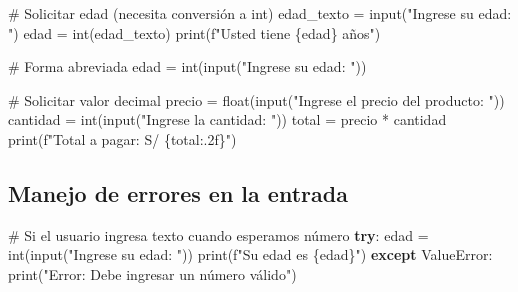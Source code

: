 \documentclass[
  doc,
  floatsintext,
  longtable,
  a4paper,
  nolmodern,
  notxfonts,
  notimes,
  12pt,
  colorlinks=true,linkcolor=blue,citecolor=blue,urlcolor=blue]{apa7}
\newenvironment{Shaded}{\begin{snugshade}}{\end{snugshade}}
\newcommand{\BuiltInTok}[1]{\textcolor[rgb]{0.00,0.23,0.31}{#1}}
\newcommand{\CommentTok}[1]{\textcolor[rgb]{0.37,0.37,0.37}{#1}}
\newcommand{\ControlFlowTok}[1]{\textcolor[rgb]{0.00,0.23,0.31}{\textbf{#1}}}
\newcommand{\NormalTok}[1]{\textcolor[rgb]{0.00,0.23,0.31}{#1}}
\newcommand{\OperatorTok}[1]{\textcolor[rgb]{0.37,0.37,0.37}{#1}}
\newcommand{\PreprocessorTok}[1]{\textcolor[rgb]{0.68,0.00,0.00}{#1}}
\newcommand{\SpecialCharTok}[1]{\textcolor[rgb]{0.37,0.37,0.37}{#1}}
\newcommand{\SpecialStringTok}[1]{\textcolor[rgb]{0.13,0.47,0.30}{#1}}
\newcommand{\StringTok}[1]{\textcolor[rgb]{0.13,0.47,0.30}{#1}}
\begin{document}
\begin{Shaded}
\begin{Highlighting}[]
\CommentTok{\# Solicitar edad (necesita conversión a int)}
\NormalTok{edad\_texto }\OperatorTok{=} \BuiltInTok{input}\NormalTok{(}\StringTok{"Ingrese su edad: "}\NormalTok{)}
\NormalTok{edad }\OperatorTok{=} \BuiltInTok{int}\NormalTok{(edad\_texto)}
\BuiltInTok{print}\NormalTok{(}\SpecialStringTok{f"Usted tiene }\SpecialCharTok{\{}\NormalTok{edad}\SpecialCharTok{\}}\SpecialStringTok{ años"}\NormalTok{)}

\CommentTok{\# Forma abreviada}
\NormalTok{edad }\OperatorTok{=} \BuiltInTok{int}\NormalTok{(}\BuiltInTok{input}\NormalTok{(}\StringTok{"Ingrese su edad: "}\NormalTok{))}

\CommentTok{\# Solicitar valor decimal}
\NormalTok{precio }\OperatorTok{=} \BuiltInTok{float}\NormalTok{(}\BuiltInTok{input}\NormalTok{(}\StringTok{"Ingrese el precio del producto: "}\NormalTok{))}
\NormalTok{cantidad }\OperatorTok{=} \BuiltInTok{int}\NormalTok{(}\BuiltInTok{input}\NormalTok{(}\StringTok{"Ingrese la cantidad: "}\NormalTok{))}
\NormalTok{total }\OperatorTok{=}\NormalTok{ precio }\OperatorTok{*}\NormalTok{ cantidad}
\BuiltInTok{print}\NormalTok{(}\SpecialStringTok{f"Total a pagar: S/ }\SpecialCharTok{\{}\NormalTok{total}\SpecialCharTok{:.2f\}}\SpecialStringTok{"}\NormalTok{)}
\end{Highlighting}
\end{Shaded}

\subsection{Manejo de errores en la
entrada}\label{manejo-de-errores-en-la-entrada}

\begin{Shaded}
\begin{Highlighting}[]
\CommentTok{\# Si el usuario ingresa texto cuando esperamos número}
\ControlFlowTok{try}\NormalTok{:}
\NormalTok{    edad }\OperatorTok{=} \BuiltInTok{int}\NormalTok{(}\BuiltInTok{input}\NormalTok{(}\StringTok{"Ingrese su edad: "}\NormalTok{))}
    \BuiltInTok{print}\NormalTok{(}\SpecialStringTok{f"Su edad es }\SpecialCharTok{\{}\NormalTok{edad}\SpecialCharTok{\}}\SpecialStringTok{"}\NormalTok{)}
\ControlFlowTok{except} \PreprocessorTok{ValueError}\NormalTok{:}
    \BuiltInTok{print}\NormalTok{(}\StringTok{"Error: Debe ingresar un número válido"}\NormalTok{)}
\end{Highlighting}
\end{Shaded}
\end{document}
